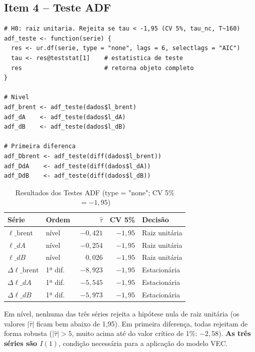 \documentclass[12pt,a4paper]{article}
\begin{document}
\subsection{Item 4 -- Teste ADF}

\begin{lstlisting}[caption={ADF com type="none", lags=6, selectlags="AIC" (pacote urca)}]
# H0: raiz unitaria. Rejeita se tau < -1,95 (CV 5%, tau_nc, T~160)
adf_teste <- function(serie) {
  res <- ur.df(serie, type = "none", lags = 6, selectlags = "AIC")
  tau <- res@teststat[1]    # estatistica de teste
  res                       # retorna objeto completo
}

# Nivel
adf_brent <- adf_teste(dados$l_brent)
adf_dA    <- adf_teste(dados$l_dA)
adf_dB    <- adf_teste(dados$l_dB)

# Primeira diferenca
adf_Dbrent <- adf_teste(diff(dados$l_brent))
adf_DdA    <- adf_teste(diff(dados$l_dA))
adf_DdB    <- adf_teste(diff(dados$l_dB))
\end{lstlisting}

\begin{table}[H]
\centering
\caption{Resultados dos Testes ADF (type = "none"; CV 5\% $= -1{,}95$)}
\label{tab:adf}
\begin{tabular}{llrrl}
\toprule
Série & Ordem & $\hat{\tau}$ & CV 5\% & Decisão \\
\midrule
$\ell\_\text{brent}$ & nível & $-0{,}421$ & $-1{,}95$ & Raiz unitária \\
$\ell\_dA$           & nível & $-0{,}254$ & $-1{,}95$ & Raiz unitária \\
$\ell\_dB$           & nível & $\phantom{-}0{,}026$ & $-1{,}95$ & Raiz unitária \\
\midrule
$\Delta\ell\_\text{brent}$ & 1ª dif. & $-8{,}923$ & $-1{,}95$ & Estacionária \\
$\Delta\ell\_dA$           & 1ª dif. & $-5{,}545$ & $-1{,}95$ & Estacionária \\
$\Delta\ell\_dB$           & 1ª dif. & $-5{,}973$ & $-1{,}95$ & Estacionária \\
\bottomrule
\end{tabular}
\end{table}

\noindent
Em nível, nenhuma das três séries rejeita a hipótese nula de raiz unitária
(os valores $|\hat{\tau}|$ ficam bem abaixo de 1,95).
Em primeira diferença, todas rejeitam de forma robusta ($|\hat{\tau}| > 5$,
muito acima até do valor crítico de 1\%: $-2{,}58$).
\textbf{As três séries são $I(1)$}, condição necessária para a aplicação do
modelo VEC.
\end{document}
